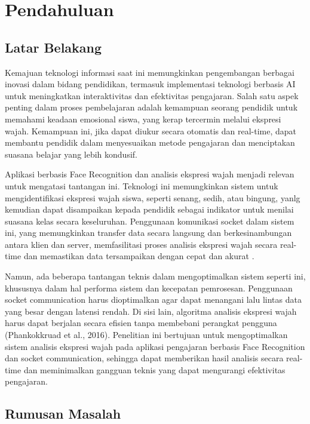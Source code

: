\chapter{Pendahuluan}
\section{Latar Belakang}
\qquad Kemajuan teknologi informasi saat ini memungkinkan pengembangan berbagai inovasi dalam bidang pendidikan, termasuk implementasi teknologi berbasis AI untuk meningkatkan interaktivitas dan efektivitas pengajaran. Salah satu aspek penting dalam proses pembelajaran adalah kemampuan seorang pendidik untuk memahami keadaan emosional siswa, yang kerap tercermin melalui ekspresi wajah. Kemampuan ini, jika dapat diukur secara otomatis dan real-time, dapat membantu pendidik dalam menyesuaikan metode pengajaran dan menciptakan suasana belajar yang lebih kondusif.

Aplikasi berbasis Face Recognition dan analisis ekspresi wajah menjadi relevan untuk mengatasi tantangan ini. Teknologi ini memungkinkan sistem untuk mengidentifikasi ekspresi wajah siswa, seperti senang, sedih, atau bingung, yanlg kemudian dapat disampaikan kepada pendidik sebagai indikator untuk menilai suasana kelas secara keseluruhan. Penggunaan komunikasi socket dalam sistem ini, yang memungkinkan transfer data secara langsung dan berkesinambungan antara klien dan server, memfasilitasi proses analisis ekspresi wajah secara real-time dan memastikan data tersampaikan dengan cepat dan akurat \cite{ogundeyiWebSocketRealTime2019}.

Namun, ada beberapa tantangan teknis dalam mengoptimalkan sistem seperti ini, khususnya dalam hal performa sistem dan kecepatan pemrosesan. Penggunaan socket communication harus dioptimalkan agar dapat menangani lalu lintas data yang besar dengan latensi rendah. Di sisi lain, algoritma analisis ekspresi wajah harus dapat berjalan secara efisien tanpa membebani perangkat pengguna (Phankokkruad et al., 2016). Penelitian ini bertujuan untuk mengoptimalkan sistem analisis ekspresi wajah pada aplikasi pengajaran berbasis Face Recognition dan socket communication, sehingga dapat memberikan hasil analisis secara real-time dan meminimalkan gangguan teknis yang dapat mengurangi efektivitas pengajaran.

\section{Rumusan Masalah}

